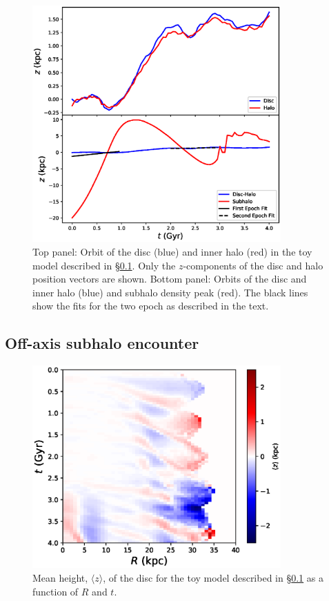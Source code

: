 \begin{figure}
	\centering
        \includegraphics[width=0.85\textwidth]{../figures/isolated_orbits_two_fits_two_panel.eps}
	\caption{Top panel: Orbit of the disc (blue) and inner halo
          (red) in the toy model described in
          \S\ref{ssec:toy_model_2}. Only the $z$-components of the
          disc and halo position vectors are shown. Bottom panel:
          Orbits of the disc and inner halo (blue) and subhalo
          density peak (red).  The black lines show the fits for the
          two epoch as described in the
          text.} \label{fig:toy_model_2_orbits}
\end{figure}

\subsection{Off-axis subhalo encounter} \label{ssec:toy_model_2}
\begin{figure}
	\centering
	\includegraphics[width=0.85\textwidth]{../figures/b_late_light_subhalo_z_0_r_a.eps}
	\caption{Mean height, $\langle z \rangle$, of the disc for the
          toy model described in \S\ref{ssec:toy_model_2} as a
          function of $R$ and
          $t$.} \label{fig:toy_model_2_mean_height}
\end{figure}

